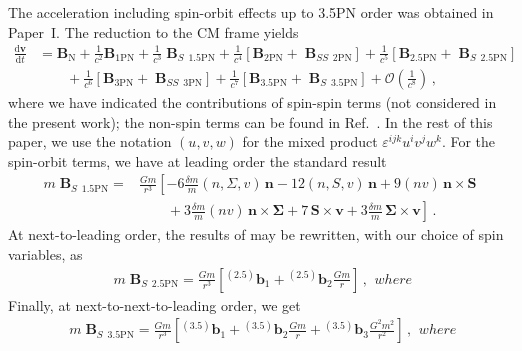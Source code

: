 \documentclass[
superscriptaddress,
preprint,
prd,tightenlines,showpacs,nofootinbib,
eqsecnum,
amsfonts,amsmath,amssymb]{revtex4-1}
\newcommand{\ud}{\mathrm{d}}
\newcommand{\calO}{\mathcal{O}}
\begin{document}
The acceleration including spin-orbit effects up to 3.5PN order was
obtained in Paper~I. The reduction to the CM frame yields
%
\begin{align}\label{aCMstruct}
\frac{\ud \mathbf{v}}{\ud t} &=
\mathbf{B}_\mathrm{N}+\frac{1}{c^2}\mathbf{B}_\mathrm{1PN}+\frac{1}{c^3}
\mathop{\mathbf{B}}_{S}{}_{\!\mathrm{1.5PN}}
+\frac{1}{c^4}\left[\mathbf{B}_\mathrm{2PN}+
\mathop{\mathbf{B}}_{SS}{}_{\!\mathrm{2PN}}\right]
+\frac{1}{c^5}\left[\mathbf{B}_\mathrm{2.5PN}+
\mathop{\mathbf{B}}_{S}{}_{\!\mathrm{2.5PN}}\right] \nonumber \\
& \qquad + \frac{1}{c^6}\left[\mathbf{B}_\mathrm{3PN}+
\mathop{\mathbf{B}}_{SS}{}_{\!\mathrm{3PN}}\right] +
\frac{1}{c^7}\left[\mathbf{B}_\mathrm{3.5PN}+
  \mathop{\mathbf{B}}_{S}{}_{\!\mathrm{3.5PN}}\right]  +
\calO\left(\frac{1}{c^8}\right) \, ,
\end{align}
%
where we have indicated the contributions of spin-spin terms (not
considered in the present work); the non-spin terms can be found in
Ref.~\cite{Blanchet2006a}. In the rest of this paper, we use the
notation $(u,v,w)$ for the mixed product
$\varepsilon^{ijk}u^iv^jw^k$. For the spin-orbit terms, we have at
leading order the standard result \cite{KWW93,Kidder1995}
%
\begin{align}
  m\mathop{\mathbf{B}}_{S}{}_{\!\mathrm{1.5PN}}=& \frac{G m}{r^3}
  \left[ -6\frac{\delta m}{m} (n,\Sigma ,v) \, \mathbf{n} - 12 (n,S,v)
    \, \mathbf{n}+ 9 (nv) \, \mathbf{ n \times S }\right. \nonumber \\
  &\left.\qquad + 3\frac{\delta m}{m} (nv) \, \mathbf{ n \times \Sigma
    }+ 7 \, \mathbf{ S \times v } + 3\frac{\delta m}{m} \, \mathbf{
      \Sigma \times v }\right]\,.
\end{align}
%
At next-to-leading order, the results of \cite{Faye2006} may be
rewritten, with our choice of spin variables, as
\begin{subequations}
\begin{align}
m \mathop{\mathbf{B}}_{S}{}_{\!\mathrm{2.5PN}} = \frac{G m}{r^3}\left[
{}^{(2.5)}\mathbf{b}_1 + {}^{(2.5)}\mathbf{b}_2 \frac{G m}{r}\right] \, ,
\end{align} 
%
where

\end{subequations}
%
Finally, at next-to-next-to-leading order, we get
%
\begin{subequations}
\begin{align}
  m \mathop{\mathbf{B}}_{S}{}_{\!\mathrm{3.5PN}} = \frac{G
    m}{r^3}\left[ {}^{(3.5)}\mathbf{b}_1 +{}^{(3.5)}\mathbf{b}_2
    \frac{G m }{r} +{}^{(3.5)}\mathbf{b}_3 \frac{G^2
      m^2}{r^2}\right]\,,
\end{align}
%
where 

\end{subequations}
\end{document}
